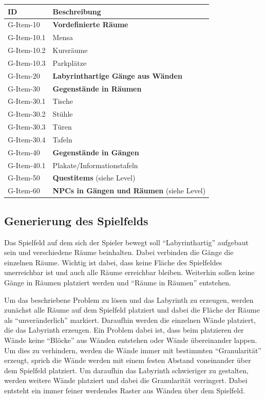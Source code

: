 \begin{tabularx}{\textwidth}{|l|l|}
\toprule
\textbf{ID} & \textbf{Beschreibung}\\
\endhead
\hline
G-Item-10 & \textbf{Vordefinierte Räume}  \\
G-Item-10.1 & Mensa  \\
G-Item-10.2 & Kursräume  \\
G-Item-10.3 & Parkplätze  \\
\hline
G-Item-20 & \textbf{Labyrinthartige Gänge aus Wänden}  \\
\hline
G-Item-30 & \textbf{Gegenstände in Räumen}  \\
G-Item-30.1 & Tische  \\
G-Item-30.2 & Stühle  \\
G-Item-30.3 & Türen \\
G-Item-30.4 & Tafeln \\
\hline
G-Item-40 & \textbf{Gegenstände in Gängen}  \\ 
G-Item-40.1 & Plakate/Informationstafeln  \\  
\hline
G-Item-50 & \textbf{Questitems} (siehe Level)\\
\hline
G-Item-60 & \textbf{NPCs in Gängen und Räumen} (siehe Level)\\
\hline
\end{tabularx}

\subsection{Generierung des Spielfelds}
Das Spielfeld auf dem sich der Spieler bewegt soll \enquote{Labyrinthartig} aufgebaut sein und verschiedene Räume beinhalten. Dabei verbinden die Gänge die einzelnen Räume. Wichtig ist dabei, dass keine Fläche des Spielfeldes unerreichbar ist und auch alle Räume erreichbar bleiben. Weiterhin sollen keine Gänge in Räumen platziert werden und \enquote{Räume in Räumen} entstehen.

Um das beschriebene Problem zu lösen und das Labyrinth zu erzeugen, werden zunächst alle Räume auf dem Spielfeld platziert und dabei die Fläche der Räume als \enquote{unveränderlich} markiert. Daraufhin werden die einzelnen Wände platziert, die das Labyrinth erzeugen. Ein Problem dabei ist, dass beim platzieren der Wände keine \enquote{Blöcke} aus Wänden entstehen oder Wände übereinander lappen. Um dies zu verhindern, werden die Wände immer mit bestimmten \enquote{Granularität} erzeugt, sprich die Wände werden mit einem festen Abstand voneinander über dem Spielfeld platziert. Um daraufhin das Labyrinth schwieriger zu gestalten, werden weitere Wände platziert und dabei die Granularität verringert. Dabei entsteht ein immer feiner werdendes Raster aus Wänden über dem Spielfeld.

